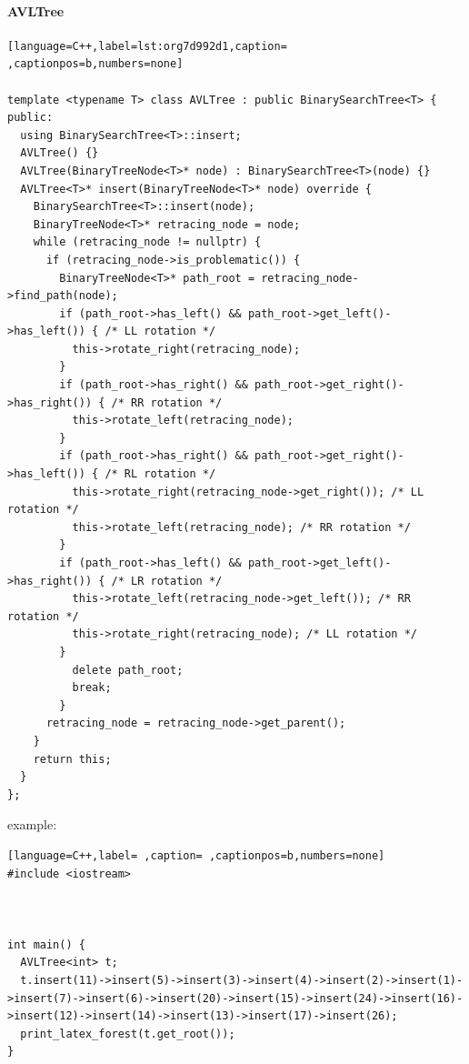 \documentclass[a4paper,12pt]{article}
\begin{document}
\paragraph{AVLTree}
\label{sec:orgc55430c}
\begin{lstlisting}[language=C++,label=lst:org7d992d1,caption= ,captionpos=b,numbers=none]

template <typename T> class AVLTree : public BinarySearchTree<T> {
public:
  using BinarySearchTree<T>::insert;
  AVLTree() {}
  AVLTree(BinaryTreeNode<T>* node) : BinarySearchTree<T>(node) {}
  AVLTree<T>* insert(BinaryTreeNode<T>* node) override {
    BinarySearchTree<T>::insert(node);
    BinaryTreeNode<T>* retracing_node = node;
    while (retracing_node != nullptr) {
      if (retracing_node->is_problematic()) {
        BinaryTreeNode<T>* path_root = retracing_node->find_path(node);
        if (path_root->has_left() && path_root->get_left()->has_left()) { /* LL rotation */
          this->rotate_right(retracing_node);
        }
        if (path_root->has_right() && path_root->get_right()->has_right()) { /* RR rotation */
          this->rotate_left(retracing_node);
        }
        if (path_root->has_right() && path_root->get_right()->has_left()) { /* RL rotation */
          this->rotate_right(retracing_node->get_right()); /* LL rotation */
          this->rotate_left(retracing_node); /* RR rotation */
        }
        if (path_root->has_left() && path_root->get_left()->has_right()) { /* LR rotation */
          this->rotate_left(retracing_node->get_left()); /* RR rotation */
          this->rotate_right(retracing_node); /* LL rotation */
        }
          delete path_root;
          break;
        }
      retracing_node = retracing_node->get_parent();
    }
    return this;
  }
};
\end{lstlisting}

example:\\[0pt]

\begin{lstlisting}[language=C++,label= ,caption= ,captionpos=b,numbers=none]
#include <iostream>



int main() {
  AVLTree<int> t;
  t.insert(11)->insert(5)->insert(3)->insert(4)->insert(2)->insert(1)->insert(7)->insert(6)->insert(20)->insert(15)->insert(24)->insert(16)->insert(12)->insert(14)->insert(13)->insert(17)->insert(26);
  print_latex_forest(t.get_root());
}
\end{lstlisting}

\begin{center}

\end{center}\\[0pt]
\end{document}
